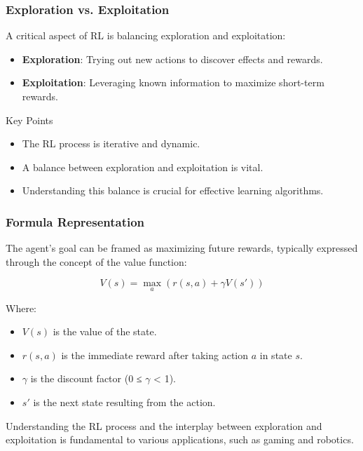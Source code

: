 \documentclass{beamer}
\begin{document}
\begin{frame}[fragile]
    \frametitle{Exploration vs. Exploitation}
    A critical aspect of RL is balancing exploration and exploitation:
    
    \begin{itemize}
        \item \textbf{Exploration}: Trying out new actions to discover effects and rewards.
        \item \textbf{Exploitation}: Leveraging known information to maximize short-term rewards.
    \end{itemize}
    
    \begin{block}{Key Points}
        \begin{itemize}
            \item The RL process is iterative and dynamic.
            \item A balance between exploration and exploitation is vital.
            \item Understanding this balance is crucial for effective learning algorithms.
        \end{itemize}
    \end{block}
\end{frame}

\begin{frame}[fragile]
    \frametitle{Formula Representation}
    The agent's goal can be framed as maximizing future rewards, typically expressed through the concept of the value function:
    
    \begin{equation}
        V(s) = \max_{a} \left( r(s, a) + \gamma V(s') \right)
    \end{equation}
    
    Where:
    \begin{itemize}
        \item \( V(s) \) is the value of the state.
        \item \( r(s, a) \) is the immediate reward after taking action \( a \) in state \( s \).
        \item \( \gamma \) is the discount factor (0 ≤ \( \gamma \) < 1).
        \item \( s' \) is the next state resulting from the action.
    \end{itemize}
    
    Understanding the RL process and the interplay between exploration and exploitation is fundamental to various applications, such as gaming and robotics.
\end{frame}
\end{document}
